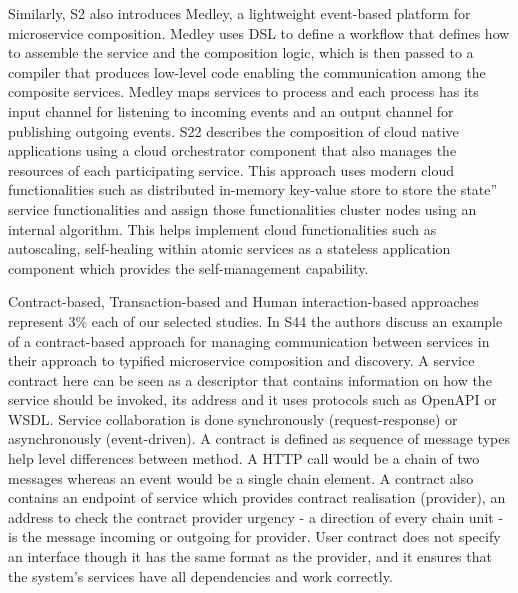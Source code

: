 \documentclass{article}
\begin{document}
\begin{multicols}{2}
Similarly, S2 also introduces Medley, a lightweight event-based platform for microservice composition. Medley uses DSL to define a workflow that defines how to assemble the service and the composition logic, which is then passed to a compiler that produces low-level code enabling the communication among the composite services. Medley maps services to process and each process has its input channel for listening to incoming events and an output channel for publishing outgoing events. S22 describes the composition of cloud native applications using a cloud orchestrator component that also manages the resources of each participating service. This approach uses modern cloud functionalities such as distributed in-memory key-value store to store the state” service functionalities and assign those functionalities cluster nodes using an internal algorithm. This helps implement cloud functionalities such as autoscaling, self-healing within atomic services as a stateless application component which provides the self-management capability. 

Contract-based, Transaction-based and Human interaction-based approaches represent 3\% each of our selected studies. In S44 the authors discuss an example of a contract-based approach for managing communication between services in their approach to typified microservice composition and discovery. A service contract here can be seen as a descriptor that contains information on how the service should be invoked, its address and it uses protocols such as OpenAPI or WSDL. Service collaboration is done synchronously (request-response) or asynchronously (event-driven). A contract is defined as sequence of message types help level differences between method.  A HTTP call would be a chain of two messages whereas an event would be a single chain element. A contract also contains an endpoint of service which provides contract realisation (provider), an address to check the contract provider urgency - a direction of every chain unit - is the message incoming or outgoing for provider. User contract does not specify an interface though it has the same format as the provider, and it ensures that the system’s services have all dependencies and work correctly.


\end{multicols}
\end{document}
